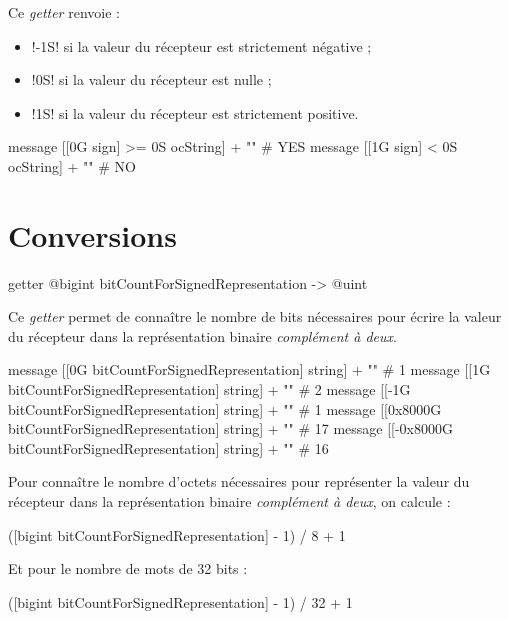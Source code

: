 Ce \emph{getter} renvoie :
\begin{itemize}
\item \ggs!-1S! si la valeur du récepteur est strictement négative ;
\item \ggs!0S! si la valeur du récepteur est nulle ;
\item \ggs!1S! si la valeur du récepteur est strictement positive.
\end{itemize}

\begin{galgas}
message [[0G sign] >= 0S ocString] + "\n" # YES
message [[1G sign] < 0S ocString] + "\n" # NO
\end{galgas}











\section{Conversions}


\begin{galgas}
getter @bigint bitCountForSignedRepresentation -> @uint
\end{galgas}

Ce \emph{getter} permet de connaître le nombre de bits nécessaires pour écrire la valeur du récepteur dans la représentation binaire \emph{complément à deux}.

\begin{galgas}
message [[0G bitCountForSignedRepresentation] string] + "\n" # 1
message [[1G bitCountForSignedRepresentation] string] + "\n" # 2
message [[-1G bitCountForSignedRepresentation] string] + "\n" # 1
message [[0x8000G bitCountForSignedRepresentation] string] + "\n" # 17
message [[-0x8000G bitCountForSignedRepresentation] string] + "\n" # 16
\end{galgas}


Pour connaître le nombre d'octets nécessaires pour représenter la valeur du récepteur dans la représentation binaire \emph{complément à deux}, on calcule :
\begin{galgas}
([bigint bitCountForSignedRepresentation] - 1) / 8 + 1 
\end{galgas}

Et pour le nombre de mots de 32 bits :
\begin{galgas}
([bigint bitCountForSignedRepresentation] - 1) / 32 + 1 
\end{galgas}



